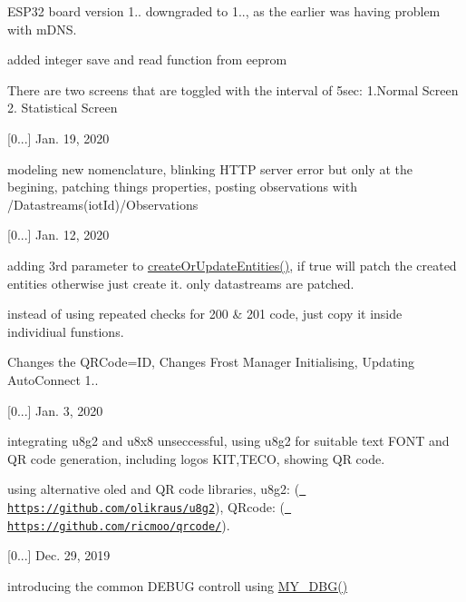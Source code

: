 \begin{DoxyItemize}
\begin{DoxyItemize}
\item E\+S\+P32 board version 1.. downgraded to 1.., as the earlier was having problem with m\+D\+NS.
\item added integer save and read function from eeprom
\item There are two screens that are toggled with the interval of 5sec\+: 1.\+Normal Screen 2. Statistical Screen
\end{DoxyItemize}
\item \mbox{[}0...\mbox{]} Jan. 19, 2020
\begin{DoxyItemize}
\item modeling new nomenclature, blinking H\+T\+TP server error but only at the begining, patching things properties, posting observations with /\+Datastreams(\textquotesingle{}iot\+Id\textquotesingle{})/\+Observations
\end{DoxyItemize}
\item \mbox{[}0...\mbox{]} Jan. 12, 2020
\begin{DoxyItemize}
\item adding 3rd parameter to \mbox{\hyperlink{main_8h_a24fe5bb6b476d220ec484ce84ee1dee4}{create\+Or\+Update\+Entities()}}, if true will patch the created entities otherwise just create it. only datastreams are patched.
\item instead of using repeated checks for 200 \& 201 code, just copy it inside individiual funstions.
\item Changes the Q\+R\+Code=ID, Changes Frost Manager Initialising, Updating Auto\+Connect 1..
\end{DoxyItemize}
\item \mbox{[}0...\mbox{]} Jan. 3, 2020
\begin{DoxyItemize}
\item integrating u8g2 and u8x8 unseccessful, using u8g2 for suitable text F\+O\+NT and QR code generation, including logos K\+IT,T\+E\+CO, showing QR code.
\item using alternative oled and QR code libraries, u8g2\+: (\href{https://github.com/olikraus/u8g2}{\texttt{ https\+://github.\+com/olikraus/u8g2}}), Q\+Rcode\+: (\href{https://github.com/ricmoo/qrcode/}{\texttt{ https\+://github.\+com/ricmoo/qrcode/}}).
\end{DoxyItemize}
\item \mbox{[}0...\mbox{]} Dec. 29, 2019
\begin{DoxyItemize}
\item introducing the common D\+E\+B\+UG controll using \mbox{\hyperlink{main_8h_a5e9ff2a0401c64386c0b7277b07063cf}{M\+Y\+\_\+\+D\+B\+G()}}

\end{DoxyItemize}
\end{DoxyItemize}
